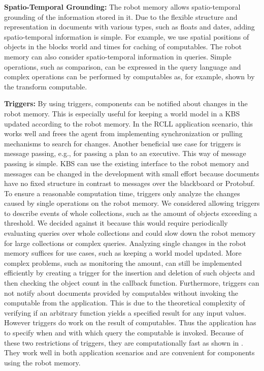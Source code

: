 \textbf{Spatio-Temporal Grounding:}
The robot memory allows spatio-temporal grounding of the information
stored in it. Due to the flexible structure and representation in documents
with various types, such as floats and dates, adding spatio-temporal
information is simple. For example, we use spatial positions
of objects in the blocks world and times for caching of computables.
The robot memory can also consider spatio-temporal information in
queries. Simple operations, such as comparison, can be expressed in
the query language and complex operations can be performed by
computables as, for example, shown by the transform computable.

\textbf{Triggers:}
By using triggers, components can be notified about changes
in the robot memory. This is especially useful for keeping a world
model in a KBS updated according to the robot memory. In the RCLL
application scenario, this works well and frees the agent from
implementing synchronization or pulling mechanisms to search for
changes. Another beneficial use case for triggers is message passing,
e.g., for passing a plan to an executive. This way of message passing
is simple. KBS can use the existing interface to the robot
memory and messages can be changed in the development with small
effort because documents have no fixed structure in contrast to
messages over the blackboard or Protobuf. To ensure a reasonable
computation time, triggers only analyze the changes caused by single
operations on the robot memory. We considered allowing triggers to
describe events of whole collections, such as the amount of objects
exceeding a threshold. We decided against it because this would
require periodically evaluating queries over whole collections and
could slow down the robot memory for large collections or complex
queries. Analyzing single changes in the robot memory suffices for
use cases, such as keeping a world model updated. 
More complex problems, such as monitoring the amount, can still be
implemented efficiently by creating a trigger for the insertion and
deletion of such objects and then checking the object count in the
callback function. Furthermore, triggers can not notify about documents
provided by computables without invoking the computable from the
application. This is due to the theoretical complexity of verifying if
an arbitrary function yields a specified result for any input
values. However triggers do work on the result of computables. Thus
the application has to specify when and with which query the computable
is invoked. Because of these two restrictions of triggers, they are
computationally fast as shown in . They
work well in both application scenarios and are convenient for
components using the robot memory.

